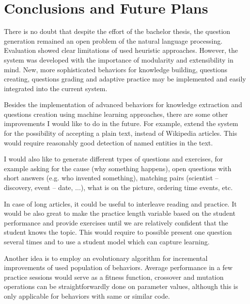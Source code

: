 \documentclass[12pt, twoside]{fithesis2}		%
\renewcommand{\_}{\leavevmode \kern0.07em\vbox{\hrule width0.4em}}
\newcounter{choice}
\begin{document}


\chapter{Conclusions and Future Plans}
\label{chap:future}

There is no doubt that despite the effort of the bachelor thesis,
the question generation remained an open problem of the natural language processing.
Evaluation showed clear limitations of used heuristic approaches.
However, the system was developed with the importance of modularity and extensibility in mind.
New, more sophisticated behaviors for knowledge building, questions creating, questions grading and adaptive practice may be implemented and easily integrated into the current system.

Besides the implementation of advanced behaviors for knowledge extraction and questions creation using machine learning approaches, there are some other improvements I would like to do in the future.
For example, extend the system for the possibility of accepting a plain text, instead of Wikipedia articles.
This would require reasonably good detection of named entities in the text.


I would also like to generate different types of questions and exercises,
for example
asking for the cause (why something happens),
open questions with short answers (e.g. who invented something),
matching pairs (scientist -- discovery,  event -- date, ...),
what is on the picture,
ordering time events, etc.

In case of long articles, it could be useful to interleave reading and practice.
It would be also great to make the practice length variable based on the student performance and provide exercises until we are relatively confident that the student knows the topic.
This would require to possible present one question several times and to use a student model which can capture learning.

Another idea is to employ an evolutionary algorithm for incremental improvements of used population of behaviors.
Average performance in a few practice sessions would serve as a fitness function,
crossover and mutation operations can be straightforwardly done on parameter values,
although this is only applicable for behaviors with same or similar code.
\end{document}

